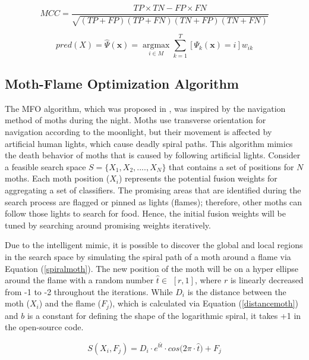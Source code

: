 \begin{equation}
	\label{eq.mcc}
	MCC=\frac{TP\times TN - FP\times FN}{\sqrt{(TP +FP)(TP+FN)(TN+FP)(TN+FN)}}
\end{equation}

\begin{equation}
	\label{eq.objective}
	pred(X)=\hat{\Psi}(\textbf{x})=\mathop{\arg\max}\limits_{i \in {M}} \mathop{\sum}\limits_{k=1}^T \left[\Psi_k(\textbf{x})=i\right]w_{ik}
\end{equation}



\subsection{Moth-Flame Optimization Algorithm}\label{Sec:4_3_5-MFO}
The MFO algorithm, which was proposed in \cite{mirjalili2015a}, was inspired by the navigation method of moths during the night. Moths use transverse orientation for navigation according to the moonlight, but their movement is affected by artificial human lights, which cause deadly spiral paths. This algorithm mimics the death behavior of moths that is caused by following artificial lights. Consider a feasible search space  $S=\{X_1, X_2,...., X_N\}$ that contains a set of positions for $N$ moths. Each moth position ($X_i$) represents the potential fusion weights for aggregating a set of classifiers. The promising areas that are identified during the search process are flagged or pinned as lights (flames); therefore, other moths can follow those lights to search for food. Hence, the initial fusion weights will be tuned by searching around promising weights iteratively.

Due to the intelligent mimic, it is possible to discover the global and local regions in the search space by simulating the spiral path of a moth around a flame via Equation (\ref{spiralmoth}). The new position of the moth will be on a hyper ellipse around the flame with a random number $\hat{t} \in$ $[r,1]$, where $r$ is linearly decreased from -1 to -2 throughout the iterations. While $D_i$ is the distance between the moth ($X_i$) and the flame ($F_j$), which is calculated via Equation (\ref{distancemoth}) and $b$ is a constant for defining the shape of the logarithmic spiral, it takes +1 in the open-source code.

\begin{equation}\label{spiralmoth}
	S(X_i,F_j)= {D_i} \cdot e^{b\hat{t}} \cdot cos\Big(2\pi\cdot \hat{t} \Big) + F_j
\end{equation}

